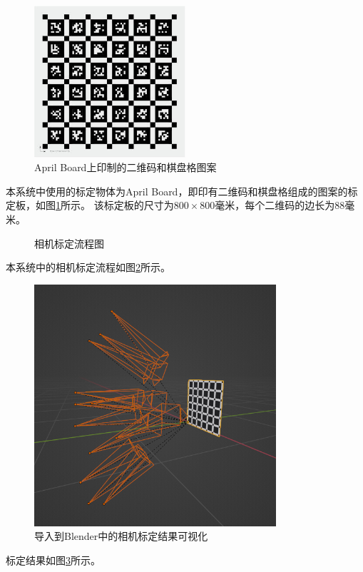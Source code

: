 \documentclass{ctexart}
\begin{document}
\begin{figure}
    \centering
    \includegraphics[width=0.5\textwidth]{figures/april_board}
    \caption{April Board上印制的二维码和棋盘格图案}
    \label{fig:april_board}
\end{figure}
本系统中使用的标定物体为April Board，即印有二维码和棋盘格组成的图案的标定板，如图\ref{fig:april_board}所示。
该标定板的尺寸为$800 \times 800$毫米，每个二维码的边长为$88$毫米。

\begin{figure}[htb]
\centering
{}
\caption{相机标定流程图}
\label{fig:calib_proc}
\end{figure}
本系统中的相机标定流程如图\ref{fig:calib_proc}所示。
\begin{figure}
\centering
\includegraphics[width=0.8\textwidth]{figures/calib_vis}
\caption{导入到Blender中的相机标定结果可视化}
\label{fig:calib_vis}
\end{figure}
标定结果如图\ref{fig:calib_vis}所示。
\end{document}
